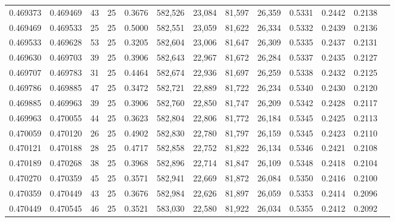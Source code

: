 \begin{tabular}{rrrrrrrrrrrrr}
0.469373 & 0.469469 &    43 &  25 &                                     0.3676 & 582,526 &  23,084 &  81,597 &  26,359 & 0.5331 & 0.2442 & 0.2138 \\
0.469469 & 0.469533 &    25 &  25 &                                     0.5000 & 582,551 &  23,059 &  81,622 &  26,334 & 0.5332 & 0.2439 & 0.2136 \\
0.469533 & 0.469628 &    53 &  25 &                                     0.3205 & 582,604 &  23,006 &  81,647 &  26,309 & 0.5335 & 0.2437 & 0.2131 \\
0.469630 & 0.469703 &    39 &  25 &                                     0.3906 & 582,643 &  22,967 &  81,672 &  26,284 & 0.5337 & 0.2435 & 0.2127 \\
0.469707 & 0.469783 &    31 &  25 &                                     0.4464 & 582,674 &  22,936 &  81,697 &  26,259 & 0.5338 & 0.2432 & 0.2125 \\
0.469786 & 0.469885 &    47 &  25 &                                     0.3472 & 582,721 &  22,889 &  81,722 &  26,234 & 0.5340 & 0.2430 & 0.2120 \\
0.469885 & 0.469963 &    39 &  25 &                                     0.3906 & 582,760 &  22,850 &  81,747 &  26,209 & 0.5342 & 0.2428 & 0.2117 \\
0.469963 & 0.470055 &    44 &  25 &                                     0.3623 & 582,804 &  22,806 &  81,772 &  26,184 & 0.5345 & 0.2425 & 0.2113 \\
0.470059 & 0.470120 &    26 &  25 &                                     0.4902 & 582,830 &  22,780 &  81,797 &  26,159 & 0.5345 & 0.2423 & 0.2110 \\
0.470121 & 0.470188 &    28 &  25 &                                     0.4717 & 582,858 &  22,752 &  81,822 &  26,134 & 0.5346 & 0.2421 & 0.2108 \\
0.470189 & 0.470268 &    38 &  25 &                                     0.3968 & 582,896 &  22,714 &  81,847 &  26,109 & 0.5348 & 0.2418 & 0.2104 \\
0.470270 & 0.470359 &    45 &  25 &                                     0.3571 & 582,941 &  22,669 &  81,872 &  26,084 & 0.5350 & 0.2416 & 0.2100 \\
0.470359 & 0.470449 &    43 &  25 &                                     0.3676 & 582,984 &  22,626 &  81,897 &  26,059 & 0.5353 & 0.2414 & 0.2096 \\
0.470449 & 0.470545 &    46 &  25 &                                     0.3521 & 583,030 &  22,580 &  81,922 &  26,034 & 0.5355 & 0.2412 & 0.2092 \\

\end{tabular}
